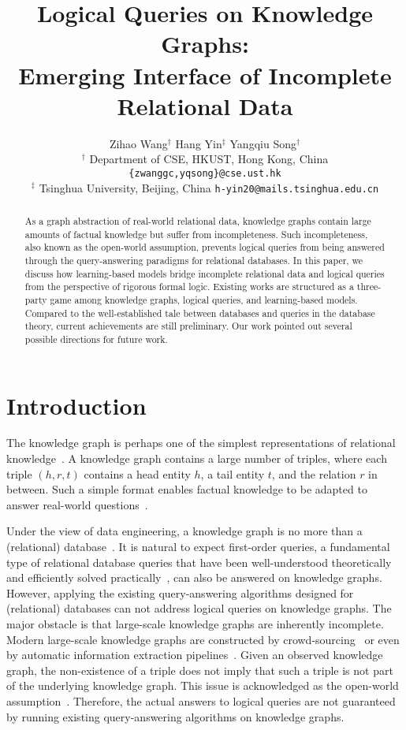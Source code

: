 \documentclass[11pt]{article}
\title{Logical Queries on Knowledge Graphs: \\ Emerging Interface of Incomplete
Relational Data}
\author{Zihao Wang$^{\dagger}$
\hspace{2em} Hang Yin$^{\ddagger}$ 
\hspace{2em} Yangqiu Song$^{\dagger}$ \\
$^{\dagger}$ Department of CSE, HKUST, Hong Kong, China \hspace{1em}
\texttt{\small\{zwanggc,yqsong\}@cse.ust.hk}\\
$^{\ddagger}$ Tsinghua University, Beijing, China \hspace{1em} \texttt{\small h-yin20@mails.tsinghua.edu.cn}}
\begin{document}
\maketitle
\begin{abstract}
As a graph abstraction of real-world relational data, knowledge graphs contain large amounts of factual knowledge but suffer from incompleteness. Such incompleteness, also known as the open-world assumption, prevents logical queries from being answered through the query-answering paradigms for relational databases. In this paper, we discuss how learning-based models bridge incomplete relational data and logical queries from the perspective of rigorous formal logic. Existing works are structured as a three-party game among knowledge graphs, logical queries, and learning-based models. Compared to the well-established tale between databases and queries in the database theory, current achievements are still preliminary. Our work pointed out several possible directions for future work.
\end{abstract}

\section{Introduction}
The knowledge graph is perhaps one of the simplest representations of relational knowledge~\cite{Bollacker2008Freebasecollaboratively,Vrandecic2014Wikidatafree,PellissierTanon2016FreebaseWikidata}. A knowledge graph contains a large number of triples, where each triple $(h, r, t)$ contains a head entity $h$, a tail entity $t$, and the relation $r$ in between. Such a simple format enables factual knowledge to be adapted to answer real-world questions~\cite{Sun2022JointLKJoint,Yasunaga2021QAGNNReasoning,Saxena2021QuestionAnswering,Ren2021LEGOLatent,Lin2019KagNetKnowledgeAware}.

Under the view of data engineering, a knowledge graph is no more than a (relational) database~\cite{abiteboul1995FoundationsDatabases}. It is natural to expect first-order queries, a fundamental type of relational database queries that have been well-understood theoretically~\cite{Libkin2004ElementsFinite} and efficiently solved practically~\cite{Kroenke2018Databaseprocessing}, can also be answered on knowledge graphs. However, applying the existing query-answering algorithms designed for (relational) databases can not address logical queries on knowledge graphs.
The major obstacle is that large-scale knowledge graphs are inherently incomplete. Modern large-scale knowledge graphs are constructed by crowd-sourcing~\cite{Vrandecic2014Wikidatafree} or even by automatic information extraction pipelines~\cite{Carlson2010ArchitectureNeverEnding}.  Given an observed knowledge graph, the non-existence of a triple does not imply that such a triple is not part of the underlying knowledge graph. This issue is acknowledged as the open-world assumption~\cite{Libkin2009OpenClosed}. 
Therefore, the actual answers to logical queries are not guaranteed by running existing query-answering algorithms on knowledge graphs.
\end{document}
